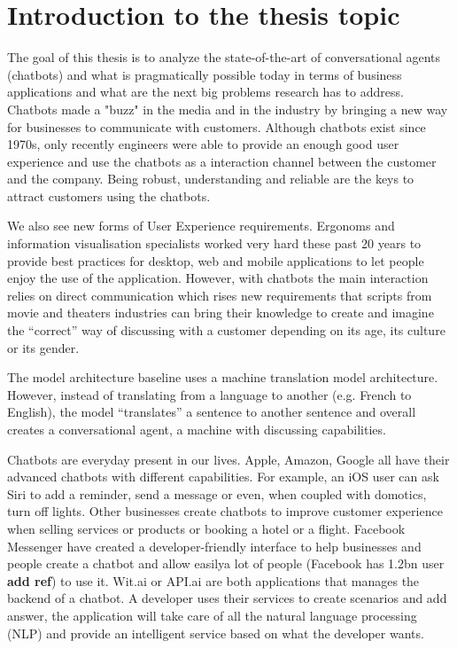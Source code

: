 
\chapter{Introduction to the thesis topic} %

\label{Chapter1} %

The goal of this thesis is to analyze the state-of-the-art of conversational agents (chatbots) and what is pragmatically possible today in terms of business applications and what are the next big problems research has to address. Chatbots made a "buzz" in the media and in the industry by bringing a new way for businesses to communicate with customers. Although chatbots exist since 1970s, only recently engineers were able to provide an enough good user experience and use the chatbots as a interaction channel between the customer and the company. Being robust, understanding and reliable are the keys to attract customers using the chatbots.

We also see new forms of User Experience requirements. Ergonoms and information visualisation specialists worked very hard these past 20 years to provide best practices for desktop, web and mobile applications to let people enjoy the use of the application. However, with chatbots the main interaction relies on direct communication which rises new requirements that scripts from movie and theaters industries can bring their knowledge to create and imagine the ``correct'' way of discussing with a customer depending on its age, its culture or its gender.

The model architecture baseline uses a machine translation model architecture. However, instead of translating from a language to another (e.g. French to English), the model ``translates'' a sentence to another sentence and overall creates a conversational agent, a machine with discussing capabilities.

Chatbots are everyday present in our lives. Apple, Amazon, Google all have their advanced chatbots with different capabilities. For example, an iOS user can ask Siri to add a reminder, send a message or even, when coupled with domotics, turn off lights. Other businesses create chatbots to improve customer experience when selling services or products or booking a hotel or a flight. Facebook Messenger have created a developer-friendly interface to help businesses and people create a chatbot and allow easilya lot of people (Facebook has 1.2bn user \textbf{add ref}) to use it. Wit.ai or API.ai are both applications that manages the backend of a chatbot. A developer uses their services to create scenarios and add answer, the application will take care of all the natural language processing (NLP) and provide an intelligent service based on what the developer wants.

